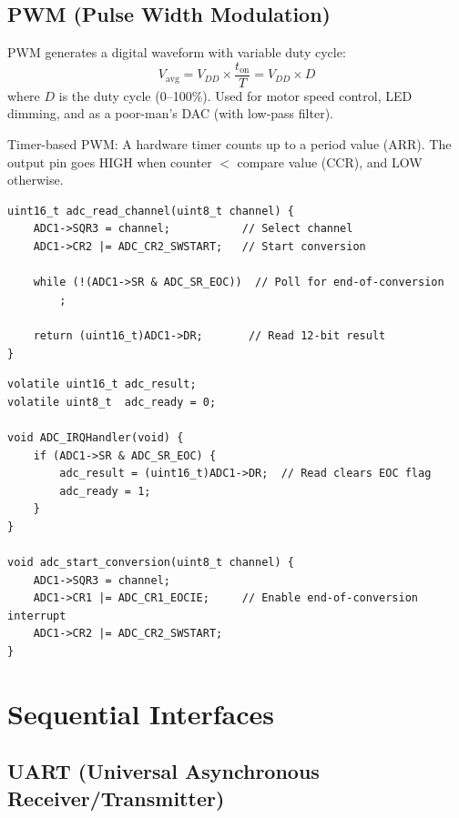 \subsection{PWM (Pulse Width Modulation)}

PWM generates a digital waveform with variable duty cycle:
\[
  V_{\text{avg}} = V_{DD} \times \frac{t_{\text{on}}}{T} = V_{DD} \times D
\]
where $D$ is the duty cycle (0--100\%). Used for motor speed control, LED dimming, and as a poor-man's DAC (with low-pass filter).

Timer-based PWM: A hardware timer counts up to a period value (ARR). The output pin goes HIGH when counter $<$ compare value (CCR), and LOW otherwise.

\begin{lstlisting}[style=C, caption={ADC read with polling on STM32.}]
uint16_t adc_read_channel(uint8_t channel) {
    ADC1->SQR3 = channel;           // Select channel
    ADC1->CR2 |= ADC_CR2_SWSTART;   // Start conversion
    
    while (!(ADC1->SR & ADC_SR_EOC))  // Poll for end-of-conversion
        ;
    
    return (uint16_t)ADC1->DR;       // Read 12-bit result
}
\end{lstlisting}

\begin{lstlisting}[style=C, caption={ADC read with interrupt on STM32.}]
volatile uint16_t adc_result;
volatile uint8_t  adc_ready = 0;

void ADC_IRQHandler(void) {
    if (ADC1->SR & ADC_SR_EOC) {
        adc_result = (uint16_t)ADC1->DR;  // Read clears EOC flag
        adc_ready = 1;
    }
}

void adc_start_conversion(uint8_t channel) {
    ADC1->SQR3 = channel;
    ADC1->CR1 |= ADC_CR1_EOCIE;     // Enable end-of-conversion interrupt
    ADC1->CR2 |= ADC_CR2_SWSTART;
}
\end{lstlisting}

\section{Sequential Interfaces}
\label{sec:io:serial}

\subsection{UART (Universal Asynchronous Receiver/Transmitter)}

